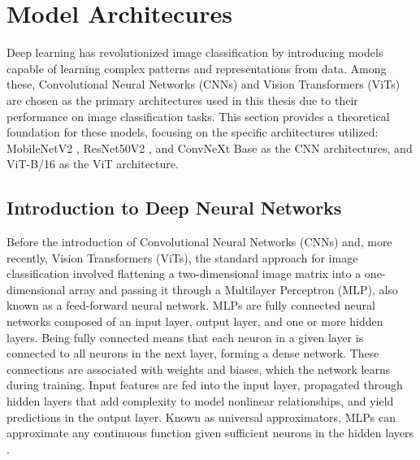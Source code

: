 
\section{Model Architecures}
\label{sec:model_arch}
Deep learning has revolutionized image classification by introducing models capable of learning complex patterns and representations from data. Among these, Convolutional Neural Networks (CNNs) and Vision Transformers (ViTs) are chosen as the primary architectures used in this thesis due to their performance on image classification tasks. This section provides a theoretical foundation for these models, focusing on the specific architectures utilized: MobileNetV2 \cite{sandler2018mobilenetv2}, ResNet50V2 \cite{he2016}, and ConvNeXt Base \cite{todi2023convnext} as the CNN architectures, and ViT-B/16 \cite{dosovitskiy2021imageworth16x16words} as the ViT architecture.



\subsection{Introduction to Deep Neural Networks}
\label{sec:intro_DNN}
Before the introduction of Convolutional Neural Networks (CNNs) and, more recently, Vision Transformers (ViTs), the standard approach for image classification involved flattening a two-dimensional image matrix into a one-dimensional array and passing it through a Multilayer Perceptron (MLP), also known as a feed-forward neural network. MLPs are fully connected neural networks composed of an input layer, output layer, and one or more hidden layers. Being fully connected means that each neuron in a given layer is connected to all neurons in the next layer, forming a dense network. These connections are associated with weights and biases, which the network learns during training. Input features are fed into the input layer, propagated through hidden layers that add complexity to model nonlinear relationships, and yield predictions in the output layer. Known as universal approximators, MLPs can approximate any continuous function given sufficient neurons in the hidden layers \cite{zhang2023dive,HORNIK1989359}.

